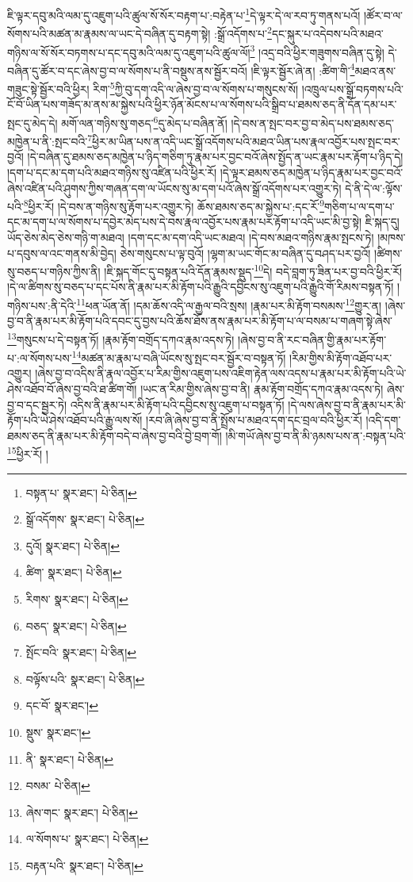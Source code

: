 ཇི་ལྟར་དབུ་མའི་ལམ་དུ་འཇུག་པའི་ཚུལ་སོ་སོར་བརྟག་པ་:བརྟེན་པ་\footnote{བསྟན་པ་  སྣར་ཐང་།  པེ་ཅིན། }དེ་ལྟར་དེ་ལ་རབ་ཏུ་གནས་པའོ། །ཚོར་བ་ལ་སོགས་པའི་མཚན་མ་རྣམས་ལ་ཡང་དེ་བཞིན་དུ་བརྟག་སྟེ། :སྒྲོ་འདོགས་པ་\footnote{སྒྲོ་འདོགས་  སྣར་ཐང་།  པེ་ཅིན། }དང་སྐུར་པ་འདེབས་པའི་མཐའ་གཉིས་ལ་སོ་སོར་བཏགས་པ་དང་དབུ་མའི་ལམ་དུ་འཇུག་པའི་ཚུལ་ལོ།\footnote{དུའོ།  སྣར་ཐང་།  པེ་ཅིན། } །འདྲ་བའི་ཕྱིར་གཟུགས་བཞིན་དུ་སྟེ། དེ་བཞིན་དུ་ཚོར་བ་དང་ཞེས་བྱ་བ་ལ་སོགས་པ་ནི་བསྡུས་ནས་སྦྱོར་བའོ། །ཇི་ལྟར་སྦྱོར་ཞེ་ན། :ཚིག་གི་\footnote{ཚིག་  སྣར་ཐང་།  པེ་ཅིན། }མཐའ་ནས་གཟུང་སྟེ་སྦྱོར་བའི་ཕྱིར། རིག་\footnote{རིགས་  སྣར་ཐང་།  པེ་ཅིན། }ཀྱི་བུ་དག་འདི་ལ་ཞེས་བྱ་བ་ལ་སོགས་པ་གསུངས་སོ། །འཁྲུལ་པས་སྒྲོ་བཏགས་པའི་ངོ་བོ་ཡིན་པས་གཟོད་མ་ནས་མ་སྐྱེས་པའི་ཕྱིར་ཉོན་མོངས་པ་ལ་སོགས་པའི་སྒྲིབ་པ་ཐམས་ཅད་ནི་དོན་དམ་པར་སྤང་དུ་མེད་དེ། མགོ་ལན་གཉིས་སུ་གཅད་\footnote{བཅད་  སྣར་ཐང་།  པེ་ཅིན། }དུ་མེད་པ་བཞིན་ནོ། །དེ་བས་ན་སྤང་བར་བྱ་བ་མེད་པས་ཐམས་ཅད་མཁྱེན་པ་ནི་:སྤང་བའི་\footnote{སྤོང་བའི་  སྣར་ཐང་།  པེ་ཅིན། }ཕྱིར་མ་ཡིན་པས་ན་འདི་ཡང་སྒྲོ་འདོགས་པའི་མཐའ་ཡིན་པས་རྣལ་འབྱོར་པས་སྤང་བར་བྱའོ། །དེ་བཞིན་དུ་ཐམས་ཅད་མཁྱེན་པ་ཉིད་གཅིག་ཏུ་རྣམ་པར་བྱང་བའོ་ཞེས་སྤྱོད་ན་ཡང་རྣམ་པར་རྟོག་པ་ཉིད་དེ། །དག་པ་དང་མ་དག་པའི་མཐའ་གཉིས་སུ་འཛིན་པའི་ཕྱིར་རོ། །དེ་ལྟར་ཐམས་ཅད་མཁྱེན་པ་ཉིད་རྣམ་པར་བྱང་བའོ་ཞེས་འཛིན་པའི་ཤུགས་ཀྱིས་གཞན་དག་ལ་ཡོངས་སུ་མ་དག་པའོ་ཞེས་སྒྲོ་འདོགས་པར་འགྱུར་ཏེ། དེ་ནི་དེ་ལ་:ལྟོས་པའི་\footnote{བལྟོས་པའི་  སྣར་ཐང་།  པེ་ཅིན། }ཕྱིར་རོ། །དེ་བས་ན་གཉིས་སུ་རྟོག་པར་འགྱུར་ཏེ། ཆོས་ཐམས་ཅད་མ་སྐྱེས་པ་:དང་རོ་\footnote{དང་བོ་  སྣར་ཐང་། }གཅིག་པ་ལ་དག་པ་དང་མ་དག་པ་ལ་སོགས་པ་དབྱེར་མེད་པས་དེ་བས་རྣལ་འབྱོར་པས་རྣམ་པར་རྟོག་པ་འདི་ཡང་མི་བྱ་སྟེ། ཇི་སྐད་དུ། ཡོད་ཅེས་མེད་ཅེས་གཉི་ག་མཐའ། །དག་དང་མ་དག་འདི་ཡང་མཐའ། །དེ་བས་མཐའ་གཉིས་རྣམ་སྤངས་ཏེ། །མཁས་པ་དབུས་ལ་འང་གནས་མི་བྱེད། ཅེས་གསུངས་པ་ལྟ་བུའོ། །ལྷག་མ་ཡང་གོང་མ་བཞིན་དུ་བཤད་པར་བྱའོ། །ཚིགས་སུ་བཅད་པ་གཉིས་ཀྱིས་ནི། །ཇི་སྐད་གོང་དུ་བསྟན་པའི་དོན་རྣམས་སྡུད་\footnote{སྡུས་  སྣར་ཐང་། }དེ། བདེ་བླག་ཏུ་ཟིན་པར་བྱ་བའི་ཕྱིར་རོ། །དེ་ལ་ཚིགས་སུ་བཅད་པ་དང་པོས་ནི་རྣམ་པར་མི་རྟོག་པའི་རྒྱུའི་དབྱིངས་སུ་འཇུག་པའི་རྒྱུའི་གོ་རིམས་བསྟན་ཏོ། །གཉིས་པས་:ནི་དེའི་\footnote{ནི་  སྣར་ཐང་།  པེ་ཅིན། }ཕན་ཡོན་ནོ། །དམ་ཆོས་འདི་ལ་རྒྱལ་བའི་སྲས། །རྣམ་པར་མི་རྟོག་བསམས་\footnote{བསམ་  པེ་ཅིན། }གྱུར་ན། །ཞེས་བྱ་བ་ནི་རྣམ་པར་མི་རྟོག་པའི་དབང་དུ་བྱས་པའི་ཆོས་ཐོས་ནས་རྣམ་པར་མི་རྟོག་པ་ལ་བསམ་པ་གཞག་སྟེ་ཞེས་\footnote{ཞེས་གང་  སྣར་ཐང་།  པེ་ཅིན། }གསུངས་པ་དེ་བསྟན་ཏོ། །རྣམ་རྟོག་བགྲོད་དཀའ་རྣམ་འདས་ཏེ། །ཞེས་བྱ་བ་ནི་རང་བཞིན་གྱི་རྣམ་པར་རྟོག་པ་:ལ་སོགས་པས་\footnote{ལ་སོགས་པ་  སྣར་ཐང་།  པེ་ཅིན། }མཚན་མ་རྣམ་པ་བཞི་ཡོངས་སུ་སྤང་བར་སྦྱོར་བ་བསྟན་ཏོ། །རིམ་གྱིས་མི་རྟོག་འཐོབ་པར་འགྱུར། །ཞེས་བྱ་བ་འདིས་ནི་རྣལ་འབྱོར་པ་རིམ་གྱིས་འཇུག་པས་འཇིག་རྟེན་ལས་འདས་པ་རྣམ་པར་མི་རྟོག་པའི་ཡེ་ཤེས་འཐོབ་བོ་ཞེས་བྱ་བའི་ཐ་ཚིག་གོ། །ཡང་ན་རིམ་གྱིས་ཞེས་བྱ་བ་ནི། རྣམ་རྟོག་བགྲོད་དཀའ་རྣམ་འདས་ཏེ། ཞེས་བྱ་བ་དང་སྦྱར་ཏེ། འདིས་ནི་རྣམ་པར་མི་རྟོག་པའི་དབྱིངས་སུ་འཇུག་པ་བསྟན་ཏོ། །དེ་ལས་ཞེས་བྱ་བ་ནི་རྣམ་པར་མི་རྟོག་པའི་ཡེ་ཤེས་འཐོབ་པའི་རྒྱུ་ལས་སོ། །རབ་ཞི་ཞེས་བྱ་བ་ནི་སྤྲོས་པ་མཐའ་དག་དང་བྲལ་བའི་ཕྱིར་རོ། །འདི་དག་ཐམས་ཅད་ནི་རྣམ་པར་མི་རྟོག་བདེ་བ་ཞེས་བྱ་བའི་བྱེ་བྲག་གོ། །མི་གཡོ་ཞེས་བྱ་བ་ནི་མི་ཉམས་པས་ན་:བསྟན་པའི་\footnote{བརྟན་པའི་  སྣར་ཐང་།  པེ་ཅིན། }ཕྱིར་རོ། །
